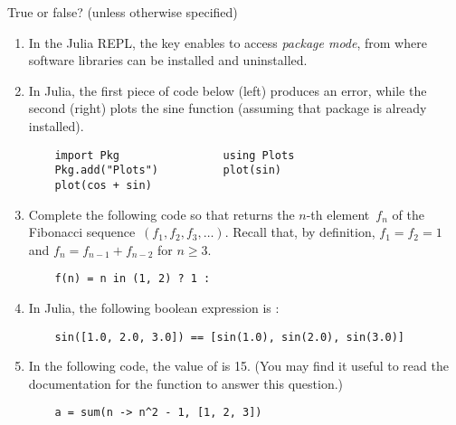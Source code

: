 \documentclass[a4paper]{article}
\begin{document}
\pagestyle{empty}
\thispagestyle{fancy}



True or false? (unless otherwise specified)

\begin{enumerate}

    \item
        In the Julia REPL, the key \julia{;} enables to access \emph{package mode},
        from where software libraries can be installed and uninstalled.

    \item
        In Julia, the first piece of code below (left) produces an error,
        while the second (right) plots the sine function
        (assuming that package  is already installed).

        \begin{verbatim}
    import Pkg                using Plots
    Pkg.add("Plots")          plot(sin)
    plot(cos + sin)               
        \end{verbatim}

    \item
        Complete the following code so that  returns the $n$-th element~$f_n$ of the Fibonacci sequence~$(f_1, f_2, f_3, \dotsc)$. 
        Recall that, by definition, $f_1 = f_2 = 1$ and $f_{n} = f_{n-1} + f_{n-2}$ for $n \geq 3$.
        \begin{verbatim}
    f(n) = n in (1, 2) ? 1 : 
        \end{verbatim}

    \item
        In Julia, the following boolean expression is :
        \begin{verbatim}
    sin([1.0, 2.0, 3.0]) == [sin(1.0), sin(2.0), sin(3.0)]
        \end{verbatim}

    \item
        In the following code, the value of  is 15.
        (You may find it useful to read the documentation for the  function to answer this question.)

        \begin{verbatim}
    a = sum(n -> n^2 - 1, [1, 2, 3])
        \end{verbatim}


\end{enumerate}
\end{document}
